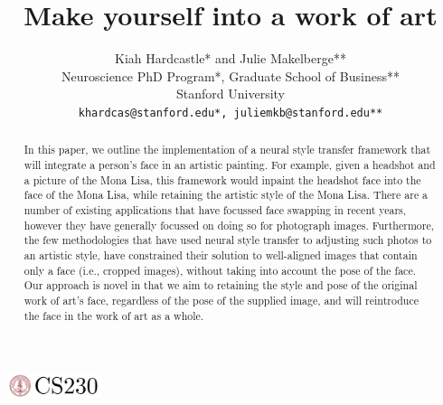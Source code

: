 \documentclass{article}
\title{Make yourself into a work of art}
\author{
  Kiah Hardcastle* and Julie Makelberge** \\
  Neuroscience PhD Program*, Graduate School of Business** \\
  Stanford University\\
  \texttt{khardcas@stanford.edu*, juliemkb@stanford.edu**} \\
}
\begin{document}

\begin{center}
\includegraphics[width=3cm, height=0.7cm]{CS230}
\end{center}

\maketitle

\begin{abstract}
In this paper, we outline the implementation of a neural style transfer framework that will integrate a person's face in an artistic painting. For example, given a headshot and a picture of the Mona Lisa, this framework would inpaint the headshot face into the face of the Mona Lisa, while retaining the artistic style of the Mona Lisa. There are a number of existing applications that have focussed face swapping in recent years, however they have generally focussed on doing so for photograph images. Furthermore, the few methodologies that have used neural style transfer to adjusting such photos to an artistic style, have constrained their solution to well-aligned images that contain only a face (i.e., cropped images), without taking into account the pose of the face. Our approach is novel in that we aim to retaining the style and pose of the original work of art's face, regardless of the pose of the supplied image, and will reintroduce the face in the work of art as a whole. 
\end{abstract}
\end{document}
